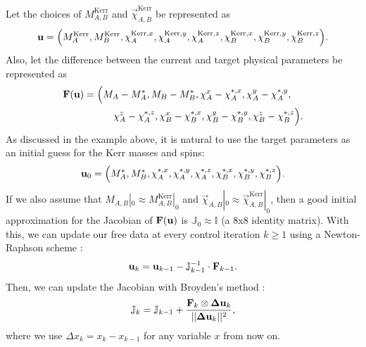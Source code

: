 \documentclass{../document}
\begin{document}
  Let the choices of $M^\text{Kerr}_{A,B}$ and $\vec\chi^\text{Kerr}_{A,B}$ be represented as
  \begin{equation}
    {\bf u} = \Big( M^\text{Kerr}_A, M^\text{Kerr}_B, \chi^{\text{Kerr},x}_A, \chi^{\text{Kerr},y}_A, \chi^{\text{Kerr},z}_A, \chi^{\text{Kerr},x}_B, \chi^{\text{Kerr},y}_B, \chi^{\text{Kerr},z}_B \Big).
  \end{equation}
  Also, let the difference between the current and target physical parameters be represented as
  \begin{equation}
    \begin{aligned}
      {\bf F}({\bf u}) &= \Big( M_A - M^*_A, M_B - M^*_B, \chi^x_A - \chi^{*,x}_A, \chi^y_A - \chi^{*,y}_A, \\
      &\qquad\quad \chi^z_A - \chi^{*,z}_A, \chi^x_B - \chi^{*,x}_B, \chi^y_B - \chi^{*,y}_B, \chi^z_B - \chi^{*,z}_B \Big).
    \end{aligned}
  \end{equation}
  As discussed in the example above, it is natural to use the target parameters as an initial guess for the Kerr masses and spins:
  \begin{equation}
    {\bf u}_0 = \Big( M^*_A, M^*_B, \chi^{*,x}_A, \chi^{*,y}_A, \chi^{*,z}_A, \chi^{*,x}_B, \chi^{*,y}_B, \chi^{*,z}_B \Big).
  \end{equation}
  If we also assume that $M_{A,B}|_0 \approx M^\text{Kerr}_{A,B}|_0$ and $\vec\chi_{A,B}|_0 \approx \vec\chi^\text{Kerr}_{A,B}|_0$, then a good initial approximation for the Jacobian of ${\bf F}({\bf u})$ is $\mathbb{J}_0 \approx \mathbb{I}$ (a 8x8 identity matrix). With this, we can update our free data at every control iteration $k \geq 1$ using a Newton-Raphson scheme \cite{NumericalRecipes}:
  \begin{equation}\label{eq:u-iteration}
    {\bf u}_k = {\bf u}_{k-1} - \mathbb{J}^{-1}_{k-1} \cdot {\bf F}_{k-1}.
  \end{equation}
  Then, we can update the Jacobian with Broyden's method \cite{NumericalRecipes}:
  \begin{equation}\label{eq:J-iteration}
    \mathbb{J}_k = \mathbb{J}_{k-1} + \frac{{\bf F}_k \otimes {\bf \Delta u}_k}{||{\bf \Delta u}_k||^2},
  \end{equation}
  where we use $\Delta x_k = x_k - x_{k-1}$ for any variable $x$ from now on.
\end{document}
